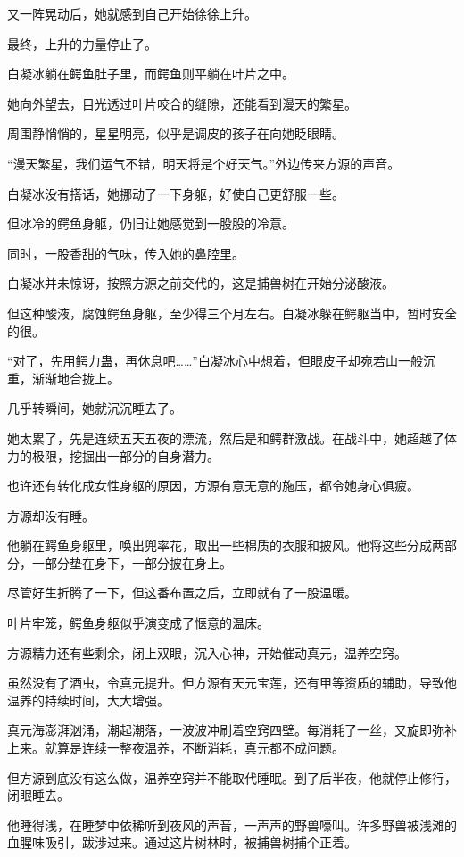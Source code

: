 \begin{this_body}
又一阵晃动后，她就感到自己开始徐徐上升。

最终，上升的力量停止了。

白凝冰躺在鳄鱼肚子里，而鳄鱼则平躺在叶片之中。

她向外望去，目光透过叶片咬合的缝隙，还能看到漫天的繁星。

周围静悄悄的，星星明亮，似乎是调皮的孩子在向她眨眼睛。

“漫天繁星，我们运气不错，明天将是个好天气。”外边传来方源的声音。

白凝冰没有搭话，她挪动了一下身躯，好使自己更舒服一些。

但冰冷的鳄鱼身躯，仍旧让她感觉到一股股的冷意。

同时，一股香甜的气味，传入她的鼻腔里。

白凝冰并未惊讶，按照方源之前交代的，这是捕兽树在开始分泌酸液。

但这种酸液，腐蚀鳄鱼身躯，至少得三个月左右。白凝冰躲在鳄躯当中，暂时安全的很。

“对了，先用鳄力蛊，再休息吧……”白凝冰心中想着，但眼皮子却宛若山一般沉重，渐渐地合拢上。

几乎转瞬间，她就沉沉睡去了。

她太累了，先是连续五天五夜的漂流，然后是和鳄群激战。在战斗中，她超越了体力的极限，挖掘出一部分的自身潜力。

也许还有转化成女性身躯的原因，方源有意无意的施压，都令她身心俱疲。

方源却没有睡。

他躺在鳄鱼身躯里，唤出兜率花，取出一些棉质的衣服和披风。他将这些分成两部分，一部分垫在身下，一部分披在身上。

尽管好生折腾了一下，但这番布置之后，立即就有了一股温暖。

叶片牢笼，鳄鱼身躯似乎演变成了惬意的温床。

方源精力还有些剩余，闭上双眼，沉入心神，开始催动真元，温养空窍。

虽然没有了酒虫，令真元提升。但方源有天元宝莲，还有甲等资质的辅助，导致他温养的持续时间，大大增强。

真元海澎湃汹涌，潮起潮落，一波波冲刷着空窍四壁。每消耗了一丝，又旋即弥补上来。就算是连续一整夜温养，不断消耗，真元都不成问题。

但方源到底没有这么做，温养空窍并不能取代睡眠。到了后半夜，他就停止修行，闭眼睡去。

他睡得浅，在睡梦中依稀听到夜风的声音，一声声的野兽嚎叫。许多野兽被浅滩的血腥味吸引，跋涉过来。通过这片树林时，被捕兽树捕个正着。

\end{this_body}

